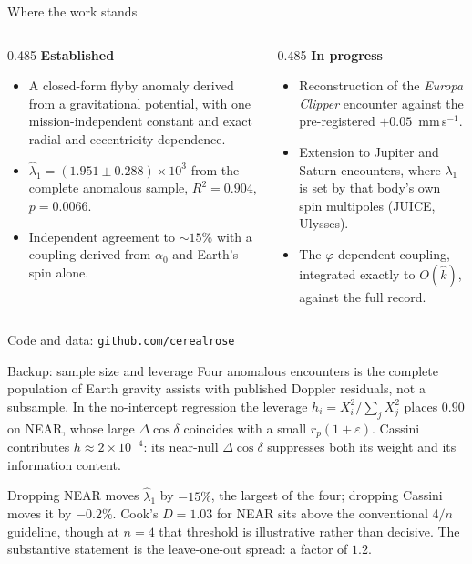 \documentclass[aspectratio=169,10pt]{beamer}
\newif\ifbackup
\newcommand{\Dcosd}{\Delta\!\cos\delta}
\newcommand{\eps}{\varepsilon}
\begin{document}
\begin{frame}{Where the work stands}
  \vspace{0.3em}
  \begin{columns}[T]
    \begin{column}{0.485\textwidth}
      \footnotesize
      \textbf{Established}
      \begin{itemize}\setlength\itemsep{0.30em}
        \item A closed-form flyby anomaly derived from a gravitational
              potential, with one mission-independent constant and exact
              radial and eccentricity dependence.
        \item $\hat\lambda_1=(1.951\pm0.288)\times10^{3}$ from the
              complete anomalous sample, $R^2=0.904$, $p=0.0066$.
        \item Independent agreement to $\sim15\%$ with a coupling
              derived from $\alpha_0$ and Earth's spin alone.
      \end{itemize}
    \end{column}
    \begin{column}{0.485\textwidth}
      \footnotesize
      \textbf{In progress}
      \begin{itemize}\setlength\itemsep{0.30em}
        \item Reconstruction of the \textit{Europa Clipper} encounter
              against the pre-registered $+0.05$~mm\,s$^{-1}$.
        \item Extension to Jupiter and Saturn encounters, where
              $\lambda_1$ is set by that body's own spin multipoles
              (JUICE, Ulysses).
        \item The $\varphi$-dependent coupling, integrated exactly to
              $O(\hat k)$, against the full record.
      \end{itemize}
    \end{column}
  \end{columns}

  \vspace{0.6em}
  {\scriptsize\color{muted}
  Code and data: \texttt{github.com/cerealrose}}

\end{frame}

\ifbackup
\appendix

\begin{frame}{Backup: sample size and leverage}
  \footnotesize
  Four anomalous encounters is the complete population of Earth gravity
  assists with published Doppler residuals, not a subsample. In the
  no-intercept regression the leverage $h_i=X_i^2/\sum_j X_j^2$ places
  $0.90$ on NEAR, whose large $\Dcosd$ coincides with a small
  $r_p(1+\eps)$. Cassini contributes $h\approx2\times10^{-4}$: its
  near-null $\Dcosd$ suppresses both its weight and its information
  content.

  \vspace{0.5em}
  Dropping NEAR moves $\hat\lambda_1$ by $-15\%$, the largest of the
  four; dropping Cassini moves it by $-0.2\%$. Cook's $D=1.03$ for NEAR
  sits above the conventional $4/n$ guideline, though at $n=4$ that
  threshold is illustrative rather than decisive. The substantive
  statement is the leave-one-out spread: a factor of $1.2$.
\end{frame}
\end{document}
